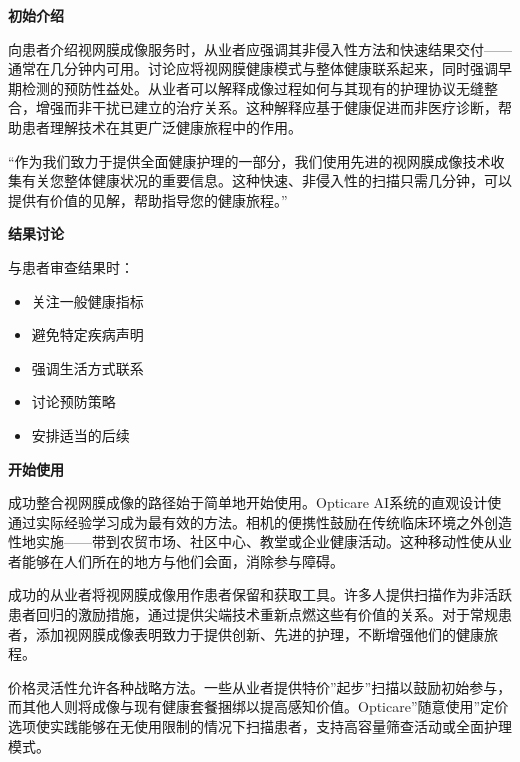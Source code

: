 \documentclass[
  Letterpaper,
]{scrbook}
\providecommand{\tightlist}{%
  \setlength{\itemsep}{0pt}\setlength{\parskip}{0pt}}\usepackage{longtable,booktabs,array}
\begin{document}
\textbf{初始介绍}

向患者介绍视网膜成像服务时，从业者应强调其非侵入性方法和快速结果交付------通常在几分钟内可用。讨论应将视网膜健康模式与整体健康联系起来，同时强调早期检测的预防性益处。从业者可以解释成像过程如何与其现有的护理协议无缝整合，增强而非干扰已建立的治疗关系。这种解释应基于健康促进而非医疗诊断，帮助患者理解技术在其更广泛健康旅程中的作用。

\begin{tcolorbox}[enhanced jigsaw, arc=.35mm, breakable, colbacktitle=quarto-callout-note-color!10!white, colback=white, toprule=.15mm, opacityback=0, left=2mm, titlerule=0mm, colframe=quarto-callout-note-color-frame, bottomrule=.15mm, toptitle=1mm, bottomtitle=1mm, rightrule=.15mm, leftrule=.75mm, coltitle=black, title=\textcolor{quarto-callout-note-color}{\faInfo}\hspace{0.5em}{示例介绍脚本}, opacitybacktitle=0.6]

``作为我们致力于提供全面健康护理的一部分，我们使用先进的视网膜成像技术收集有关您整体健康状况的重要信息。这种快速、非侵入性的扫描只需几分钟，可以提供有价值的见解，帮助指导您的健康旅程。''

\end{tcolorbox}

\textbf{结果讨论}

与患者审查结果时：

\begin{itemize}
\tightlist
\item
  关注一般健康指标
\item
  避免特定疾病声明
\item
  强调生活方式联系
\item
  讨论预防策略
\item
  安排适当的后续
\end{itemize}

\textbf{开始使用}

成功整合视网膜成像的路径始于简单地开始使用。Opticare
AI系统的直观设计使通过实际经验学习成为最有效的方法。相机的便携性鼓励在传统临床环境之外创造性地实施------带到农贸市场、社区中心、教堂或企业健康活动。这种移动性使从业者能够在人们所在的地方与他们会面，消除参与障碍。

成功的从业者将视网膜成像用作患者保留和获取工具。许多人提供扫描作为非活跃患者回归的激励措施，通过提供尖端技术重新点燃这些有价值的关系。对于常规患者，添加视网膜成像表明致力于提供创新、先进的护理，不断增强他们的健康旅程。

价格灵活性允许各种战略方法。一些从业者提供特价''起步''扫描以鼓励初始参与，而其他人则将成像与现有健康套餐捆绑以提高感知价值。Opticare''随意使用''定价选项使实践能够在无使用限制的情况下扫描患者，支持高容量筛查活动或全面护理模式。
\end{document}
